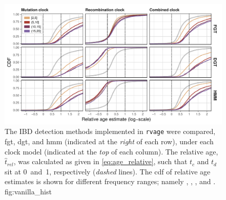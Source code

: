 

\begin{figure}[!htb]
\includegraphics[width=\textwidth]{./img/ch5/vanilla_hist}
{The  IBD detection methods implemented in \texttt{rvage} were compared, \ie \gls{fgt}, \gls{dgt}, and \gls{hmm} (indicated at the \emph{right} of each row), under each clock model (indicated at the \emph{top} of each column).
The relative age, ${\hat{t}_\textit{rel}}$, was calculated as given in \cref{eq:age_relative}, such that $t_c$ and $t_d$ sit at 0~and~1, respectively (\emph{dashed} lines).
The \gls{cdf} of relative age estimates is shown for different frequency ranges; namely \fk{[2,5]}, \fk{(5,10]}, \fk{(10,15]}, and \fk{(15,20]}.}
{fig:vanilla_hist}
\end{figure}
